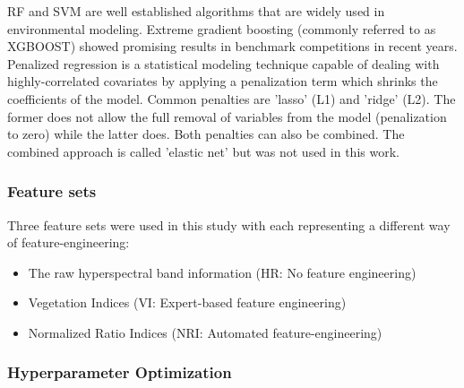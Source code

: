 \documentclass[letterpaper, peerreview]{IEEEtran}
\begin{document}
\noindent \ac{RF} and {SVM} are well established algorithms that are widely used in environmental modeling.
Extreme gradient boosting (commonly referred to as \ac{XGBOOST}) showed promising results in benchmark competitions in recent years.
Penalized regression is a statistical modeling technique capable of dealing with highly-correlated covariates by applying a penalization term which shrinks the coefficients of the model\cite{hastie2001}.
Common penalties are 'lasso' (L1) and 'ridge' (L2).
The former does not allow the full removal of variables from the model (penalization to zero) while the latter does.
Both penalties can also be combined.
The combined approach is called 'elastic net' but was not used in this work.

\subsubsection{Feature sets}

\noindent Three feature sets were used in this study with each representing a different way of feature-engineering:


\begin{itemize}
	\item The raw hyperspectral band information (HR: No feature engineering) %
	\item Vegetation Indices (\ac{VI}: Expert-based feature engineering)
	\item Normalized Ratio Indices (\ac{NRI}: Automated feature-engineering)
\end{itemize}

\subsubsection{Hyperparameter Optimization}
\end{document}
